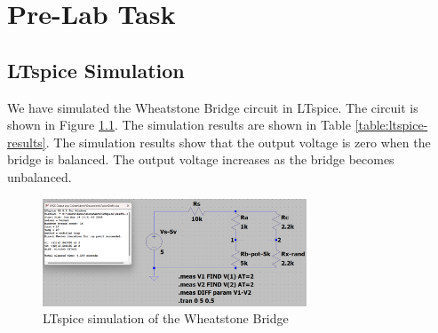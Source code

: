 \chapter{Pre-Lab Task}

\section{LTspice Simulation}

We have simulated the Wheatstone Bridge circuit in LTspice. The circuit is shown in Figure \ref{fig:ltspice}. The simulation results are shown in Table \ref{table:ltspice-results}. The simulation results show that the output voltage is zero when the bridge is balanced. The output voltage increases as the bridge becomes unbalanced.

\begin{figure}[h]
    \centering
    \includegraphics[width=0.7\textwidth]{assets/ltspice.png}
    \caption{LTspice simulation of the Wheatstone Bridge}
    \label{fig:ltspice}
\end{figure}

